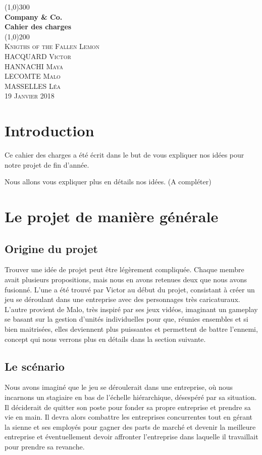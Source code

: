 \documentclass{article}
\begin{document}
\begin{titlepage} 
	\begin{center}
	\line(1,0){300}\\
	[2mm]
	\huge{\bfseries Company \& Co. \\Cahier des charges}\\
	[1mm]
	\line(1,0){200}\\
	[1.5 cm]
	\textsc{\LARGE Knigths of the Fallen Lemon}\\
	[0.75 cm]
	\textsc{\Large HACQUARD Victor\\HANNACHI Maya\\LECOMTE Malo\\MASSELLES Léa}\\
	[1 cm]
	\textsc{\large 19 Janvier 2018}
	\end{center}
\end{titlepage}

\tableofcontents
\newpage

\section*{Introduction}
Ce cahier des charges a été écrit dans le but de vous expliquer nos idées pour notre projet de fin d'année.

Nous allons vous expliquer plus en détails nos idées. (A compléter)

\section{Le projet de manière générale}
\subsection{Origine du projet}
Trouver une idée de projet peut être légèrement compliquée. Chaque membre avait plusieurs propositions, mais nous en avons retenues deux que nous avons fusionné. L'une a été trouvé par Victor au début du projet, consistant à créer un jeu se déroulant dans une entreprise avec des personnages très caricaturaux. L'autre provient de Malo, très inspiré par ses jeux vidéos, imaginant un gameplay se basant sur la gestion d'unités individuelles pour que, réunies ensembles et si bien maitrisées, elles deviennent plus puissantes et permettent de battre l'ennemi, concept qui nous verrons plus en détails dans la section suivante.

\subsection{Le scénario}
Nous avons imaginé que le jeu se déroulerait dans une entreprise, où nous incarnons un stagiaire en bas de l'échelle hiérarchique, désespéré par sa situation. Il déciderait de quitter son poste pour fonder sa propre entreprise et prendre sa vie en main. Il devra alors combattre les entreprises concurrentes tout en gérant la sienne et ses employés pour gagner des parts de marché et devenir la meilleure entreprise et éventuellement devoir affronter l'entreprise dans laquelle il travaillait pour prendre sa revanche.
\end{document}
